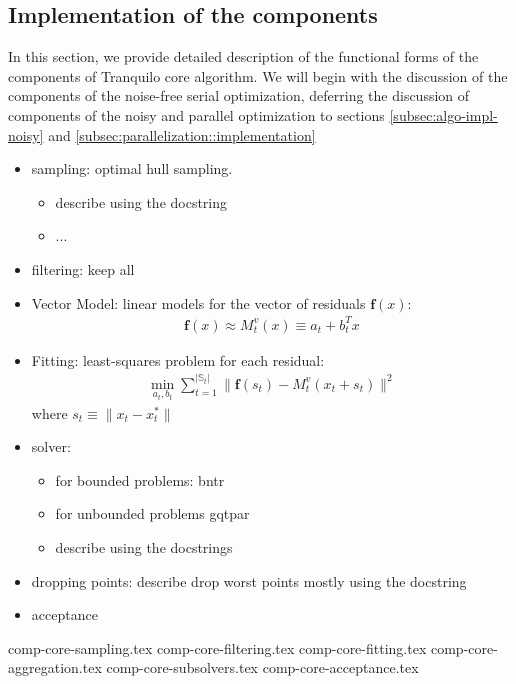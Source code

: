 \subsection{Implementation of the components}
\label{subsec:core-implementation}
In this section, we provide detailed description of the functional forms of the components of Tranquilo core algorithm. We will begin with the discussion of the components of the noise-free serial optimization, deferring the discussion of components of the noisy and parallel optimization to sections \ref{subsec:algo-impl-noisy} and \ref{subsec:parallelization::implementation}
\begin{itemize}
    \item sampling: optimal hull sampling.
        \begin{itemize}
            \item describe using the docstring
            \item ...
        \end{itemize}
    \item filtering: keep all
    \item Vector Model:  linear models for the vector of residuals $\mathbf{f}(x)$:
    \begin{align}
        \mathbf{f}(x)\approx M^v_{t}(x) \equiv a_t+b_t^Tx
        \label{eq:model-linear}
    \end{align}
    \item Fitting: least-squares problem for each residual:
    \begin{align}
        \min\limits_{a_{t},b_{t}}\sum\limits_{t=1}^{|\mathbb{S}_t|}\lVert\mathbf{f}(s_t)-M_t^v(x_t+s_t)\rVert^2
        \label{eq:fit-linear}
    \end{align}
    where $s_t\equiv\lVert x_t-x_t^*\rVert$
    \item solver:
        \begin{itemize}
            \item for bounded problems: bntr
            \item for unbounded problems gqtpar
            \item describe using the docstrings
        \end{itemize}
    \item  dropping points: describe drop worst points mostly using the docstring
    \item acceptance
\end{itemize}
{comp-core-sampling.tex}
{comp-core-filtering.tex}
{comp-core-fitting.tex}
{comp-core-aggregation.tex}
{comp-core-subsolvers.tex}
{comp-core-acceptance.tex}
